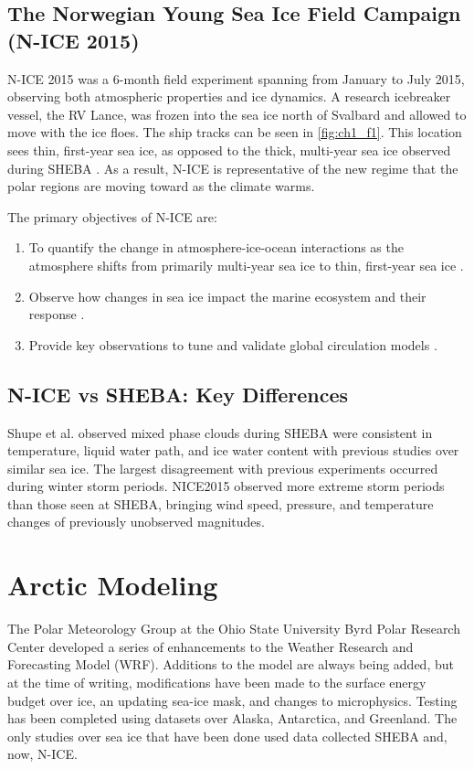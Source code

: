 \subsection{The Norwegian Young Sea Ice Field Campaign (N-ICE 2015)}
N-ICE 2015 was a 6-month field experiment spanning from January to July 2015, observing both atmospheric properties and ice dynamics. A research icebreaker vessel, the RV Lance, was frozen into the sea ice north of Svalbard and allowed to move with the ice floes. The ship tracks can be seen in \ref{fig:ch1_f1}. This location sees thin, first-year sea ice, as opposed to the thick, multi-year sea ice observed during SHEBA \cite{cohen:2017}. As a result, N-ICE is representative of the new regime that the polar regions are moving toward as the climate warms. 

The primary objectives of N-ICE are:

\begin{enumerate}
    \item To quantify the change in atmosphere-ice-ocean interactions as the atmosphere shifts from primarily multi-year sea ice to thin, first-year sea ice \cite{granskog:2018, granskog:2015}. 
    \item Observe how changes in sea ice impact the marine ecosystem and their response \cite{granskog:2015}.
    \item Provide key observations to tune and validate global circulation models \cite{granskog:2018, granskog:2015}.
\end{enumerate}

\subsection{N-ICE vs SHEBA: Key Differences}
Shupe et al. \cite{shupe:2004} observed mixed phase clouds during SHEBA were consistent in temperature, liquid water path, and ice water content with previous studies over similar sea ice. The largest disagreement with previous experiments occurred during winter storm periods. NICE2015 observed more extreme storm periods than those seen at SHEBA, bringing wind speed, pressure, and temperature changes of previously unobserved magnitudes. 

\section{Arctic Modeling}
The Polar Meteorology Group at the Ohio State University Byrd Polar Research Center developed a series of enhancements to the Weather Research and Forecasting Model (WRF). Additions to the model are always being added, but at the time of writing, modifications have been made to the surface energy budget over ice, an updating sea-ice mask, and changes to microphysics. Testing has been completed using datasets over Alaska, Antarctica, and Greenland. The only studies over sea ice that have been done used data collected SHEBA and, now, N-ICE. 

